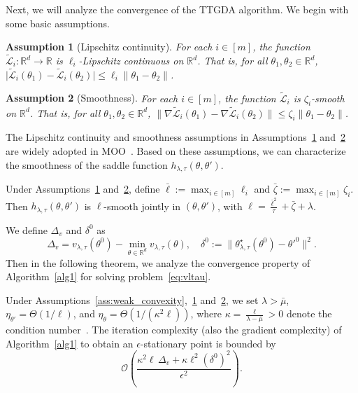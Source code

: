 \documentclass[sigconf]{acmart}
\newtheorem{assumption}{Assumption}
\begin{document}
Next, we will analyze the convergence of the TTGDA algorithm. We begin with some basic assumptions.

\begin{assumption}[Lipschitz continuity]
\label{ass:lipschitz}
For each $i\in[m]$, the function $\tilde{\mathcal{L}}_i:\mathbb{R}^d \to\mathbb{R}$ is
$\ell_i$-Lipschitz continuous on $\mathbb{R}^d$. That is, for all
$\theta_1,\theta_2\in \mathbb{R}^d$, $\big|\tilde{\mathcal{L}}_i(\theta_1)-\tilde{\mathcal{L}}_i(\theta_2)
\big|\le \ell_i \|\theta_1-\theta_2\|$.
\end{assumption}


\begin{assumption}[Smoothness]
\label{ass:smoothness}
For each $i\in[m]$, the function $\tilde{\mathcal{L}}_i$ is $\zeta_i$-smooth on $\mathbb{R}^d$. That is, for all $\theta_1,\theta_2\in \mathbb{R}^d$, $\|\nabla \tilde{\mathcal{L}}_i(\theta_1)-\nabla \tilde{\mathcal{L}}_i(\theta_2)\|
\le \zeta_i \|\theta_1-\theta_2\|$.
\end{assumption}

The Lipschitz continuity and smoothness assumptions in Assumptions~\ref{ass:lipschitz} and~\ref{ass:smoothness} are widely adopted in MOO~\cite{ sener2018multi,lin2024smooth,chen2025gradient}. Based on these assumptions, we can characterize the smoothness of the saddle function $h_{\lambda,\tau}(\theta,\theta')$.
\begin{lemma}\label{smoothnessh}
Under Assumptions~\ref{ass:lipschitz} and~\ref{ass:smoothness}, define $\bar{\ell}:=\max_{i\in[m]}\ell_i$ and $\bar{\zeta}:=\max_{i\in[m]}\zeta_i$. Then $h_{\lambda,\tau}(\theta,\theta')$ is $\ell$-smooth jointly in $(\theta,\theta')$, with $\ell=\frac{\bar{\ell}^2}{\tau}+\bar{\zeta}+\lambda$.
\end{lemma}

\noindent
We define $\Delta_v$ and $\delta^0$ as
\[
\Delta_v =v_{\lambda,\tau}(\theta^0) - \min_{\theta\in\mathbb{R}^d} v_{\lambda,\tau}(\theta), \quad \delta^0:=\bigl\|\theta^{\star}_{\lambda,\tau}(\theta^0)-\theta'^0\bigr\|^2.
\]
Then in the following theorem, we analyze the convergence property of Algorithm~\ref{alg1} for solving problem~\eqref{eq:vltau}.

\begin{theorem}
\label{thm:gda_complexity}
Under Assumptions~\ref{ass:weak_convexity},~\ref{ass:lipschitz} and~\ref{ass:smoothness}, we set  $\lambda>\bar{\mu}$, $\eta_{\theta'}=\Theta(1/\ell)$, and $\eta_{\theta}=\Theta(1/(\kappa^2\ell))$, where $\kappa=\frac{\ell}{\lambda-\bar{\mu}}>0$ denote the condition number~\cite{lin2020gradient}. The iteration complexity (also the gradient complexity) of Algorithm~\ref{alg1} to obtain an $\epsilon$-stationary point is bounded by
\[
\mathcal{O}\!\left(
\frac{\kappa^2\ell\,\Delta_v
+
\kappa\ell^2 (\delta^0)^2}{\epsilon^2}
\right).
\]
\end{theorem}
\end{document}
